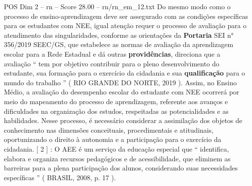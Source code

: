 \begin{textsample}{POS Dim 2 – rn – Score 28.00 – rn/rn\_em\_12.txt}
Do mesmo modo como o processo de ensino-aprendizagem deve ser assegurado com as condições específicas para os estudantes com NEE, igual atenção requer o processo de avaliação para o atendimento das singularidades, conforme as orientações da \textbf{Portaria} SEI n{\EmojiFont °} 356/2019 SEEC/GS, que estabelece as normas de avaliação da aprendizagem escolar para a Rede Estadual e dá outras \textbf{providências}, direciona que a avaliação “ tem por objetivo contribuir para o pleno desenvolvimento do estudante, sua formação para o exercício da cidadania e sua \textbf{qualificação} para o mundo do trabalho ” ( RIO GRANDE DO NORTE, 2019 ).
Assim, no Ensino Médio, a avaliação do desempenho escolar do estudante com NEE ocorrerá por meio do mapeamento do processo de aprendizagem, referente aos avanços e dificuldades na organização dos estudos, respeitadas as potencialidades e as habilidades.
Nesse processo, é necessário considerar a assimilação dos objetos de conhecimento nas dimensões conceituais, procedimentais e atitudinais, oportunizando o direito à autonomia e a participação para o exercício da cidadania. [ 2 ] : O AEE é um serviço da educação especial que “ identifica, elabora e organiza recursos pedagógicos e de acessibilidade, que eliminem as barreiras para a plena participação dos alunos, considerando suas necessidades específicas ” ( BRASIL, 2008, p. 17 ).

\end{textsample}
